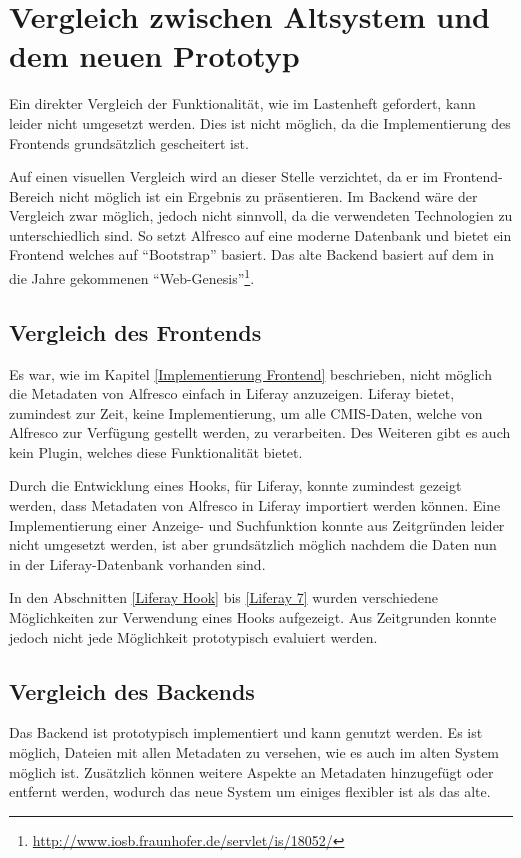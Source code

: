 \section{Vergleich zwischen Altsystem und dem neuen Prototyp}
Ein direkter Vergleich der Funktionalit\"at, wie im Lastenheft gefordert, kann leider nicht umgesetzt werden. Dies ist nicht m\"oglich, da die Implementierung des Frontends grunds\"atzlich gescheitert ist. 

Auf einen visuellen Vergleich wird an dieser Stelle verzichtet, da er im Frontend-Bereich nicht m\"oglich ist ein Ergebnis zu pr\"asentieren. Im Backend w\"are der Vergleich zwar m\"oglich, jedoch nicht sinnvoll, da die verwendeten Technologien zu unterschiedlich sind. So setzt Alfresco auf eine moderne Datenbank und bietet ein Frontend welches auf "`Bootstrap"' basiert. Das alte Backend basiert auf dem in die Jahre gekommenen "`Web-Genesis"'\footnote{\url{http://www.iosb.fraunhofer.de/servlet/is/18052/}}. 

\subsection{Vergleich des Frontends}
Es war, wie im Kapitel \ref{Implementierung Frontend} beschrieben, nicht m\"oglich die Metadaten von Alfresco einfach in Liferay anzuzeigen. Liferay bietet, zumindest zur Zeit, keine Implementierung, um alle \ac{CMIS}-Daten, welche von Alfresco zur Verf\"ugung gestellt werden, zu verarbeiten.
Des Weiteren gibt es auch kein Plugin, welches diese Funktionalit\"at bietet.

Durch die Entwicklung eines Hooks, f\"ur Liferay, konnte zumindest gezeigt werden, dass Metadaten von Alfresco in Liferay importiert werden k\"onnen. Eine Implementierung einer Anzeige- und Suchfunktion konnte aus Zeitgr\"unden leider nicht umgesetzt werden, ist aber grunds\"atzlich m\"oglich nachdem die Daten nun in der Liferay-Datenbank vorhanden sind. 

In den Abschnitten \ref{Liferay Hook} bis \ref{Liferay 7} wurden verschiedene M\"oglichkeiten zur Verwendung eines Hooks aufgezeigt. Aus Zeitgrunden konnte jedoch nicht jede M\"oglichkeit prototypisch evaluiert werden.

\subsection{Vergleich des Backends}
Das Backend ist prototypisch implementiert und kann genutzt werden. Es ist m\"oglich, Dateien mit allen Metadaten zu versehen, wie es auch im alten System m\"oglich ist. Zus\"atzlich k\"onnen weitere Aspekte an Metadaten hinzugef\"ugt oder entfernt werden, wodurch das neue System um einiges flexibler ist als das alte.

